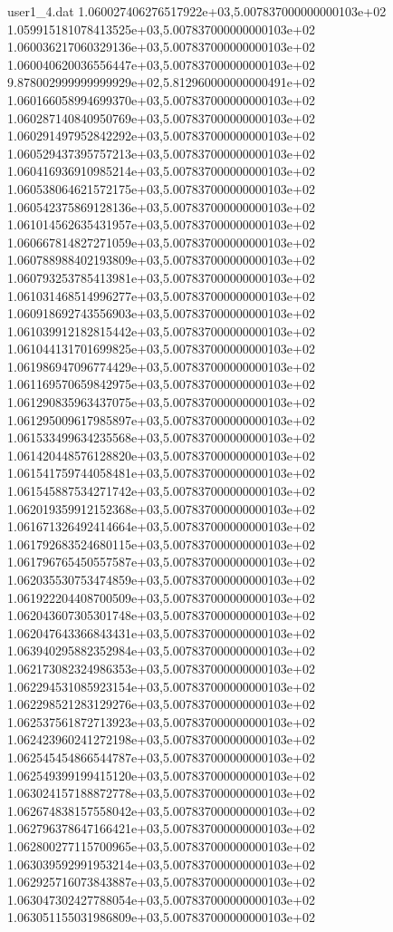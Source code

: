\begin{filecontents}{user1_4.dat}
1.060027406276517922e+03,5.007837000000000103e+02
1.059915181078413525e+03,5.007837000000000103e+02
1.060036217060329136e+03,5.007837000000000103e+02
1.060040620036556447e+03,5.007837000000000103e+02
9.878002999999999929e+02,5.812960000000000491e+02
1.060166058994699370e+03,5.007837000000000103e+02
1.060287140840950769e+03,5.007837000000000103e+02
1.060291497952842292e+03,5.007837000000000103e+02
1.060529437395757213e+03,5.007837000000000103e+02
1.060416936910985214e+03,5.007837000000000103e+02
1.060538064621572175e+03,5.007837000000000103e+02
1.060542375869128136e+03,5.007837000000000103e+02
1.061014562635431957e+03,5.007837000000000103e+02
1.060667814827271059e+03,5.007837000000000103e+02
1.060788988402193809e+03,5.007837000000000103e+02
1.060793253785413981e+03,5.007837000000000103e+02
1.061031468514996277e+03,5.007837000000000103e+02
1.060918692743556903e+03,5.007837000000000103e+02
1.061039912182815442e+03,5.007837000000000103e+02
1.061044131701699825e+03,5.007837000000000103e+02
1.061986947096774429e+03,5.007837000000000103e+02
1.061169570659842975e+03,5.007837000000000103e+02
1.061290835963437075e+03,5.007837000000000103e+02
1.061295009617985897e+03,5.007837000000000103e+02
1.061533499634235568e+03,5.007837000000000103e+02
1.061420448576128820e+03,5.007837000000000103e+02
1.061541759744058481e+03,5.007837000000000103e+02
1.061545887534271742e+03,5.007837000000000103e+02
1.062019359912152368e+03,5.007837000000000103e+02
1.061671326492414664e+03,5.007837000000000103e+02
1.061792683524680115e+03,5.007837000000000103e+02
1.061796765450557587e+03,5.007837000000000103e+02
1.062035530753474859e+03,5.007837000000000103e+02
1.061922204408700509e+03,5.007837000000000103e+02
1.062043607305301748e+03,5.007837000000000103e+02
1.062047643366843431e+03,5.007837000000000103e+02
1.063940295882352984e+03,5.007837000000000103e+02
1.062173082324986353e+03,5.007837000000000103e+02
1.062294531085923154e+03,5.007837000000000103e+02
1.062298521283129276e+03,5.007837000000000103e+02
1.062537561872713923e+03,5.007837000000000103e+02
1.062423960241272198e+03,5.007837000000000103e+02
1.062545454866544787e+03,5.007837000000000103e+02
1.062549399199415120e+03,5.007837000000000103e+02
1.063024157188872778e+03,5.007837000000000103e+02
1.062674838157558042e+03,5.007837000000000103e+02
1.062796378647166421e+03,5.007837000000000103e+02
1.062800277115700965e+03,5.007837000000000103e+02
1.063039592991953214e+03,5.007837000000000103e+02
1.062925716073843887e+03,5.007837000000000103e+02
1.063047302427788054e+03,5.007837000000000103e+02
1.063051155031986809e+03,5.007837000000000103e+02

\end{filecontents}
